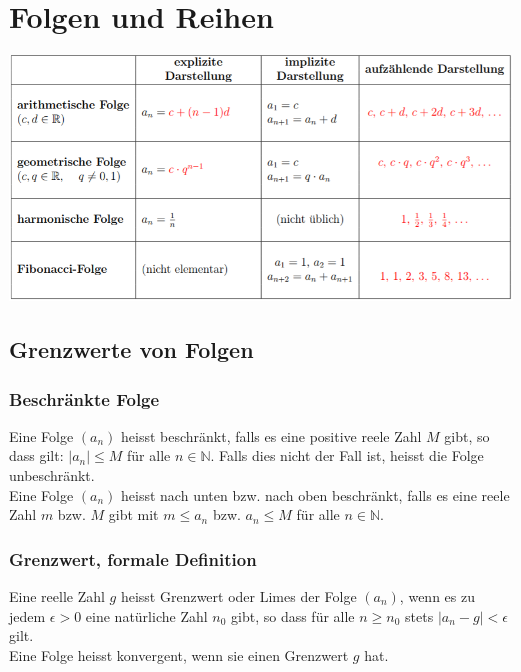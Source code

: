 \section{Folgen und Reihen}

\begin{center}
    \includegraphics[width=1\linewidth]{images/folgenreihen.png}
\end{center}

\subsection{Grenzwerte von Folgen}
\subsubsection{Beschränkte Folge}
Eine Folge $(a_n)$ heisst beschränkt, falls es eine positive reele Zahl $M$ gibt, so dass gilt: $|a_n| \leq M$ für alle $n \in \mathbb{N}$. Falls dies nicht der Fall ist, heisst die Folge unbeschränkt. \\
Eine Folge $(a_n)$ heisst nach unten bzw. nach oben beschränkt, falls es eine reele Zahl $m$ bzw. $M$ gibt mit $m \leq a_n$ bzw. $a_n \leq M$ für alle $n \in \mathbb{N}$.

\subsubsection{Grenzwert, formale Definition}
Eine reelle Zahl $g$ heisst Grenzwert oder Limes der Folge $(a_n)$, wenn es zu jedem $\epsilon > 0$ eine natürliche Zahl $n_0$ gibt, so dass für alle $n\geq n_0$ stets $|a_n - g| < \epsilon$ gilt. \\
Eine Folge heisst konvergent, wenn sie einen Grenzwert $g$ hat.

